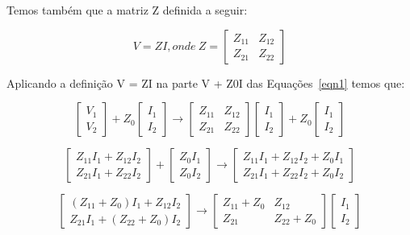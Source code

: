 \documentclass[a4paper,12pt]{proc}
\begin{document}
\noindent Temos também que a matriz Z definida a seguir:

\[V = ZI, onde~ Z = \begin{bmatrix} Z_{11} & Z_{12} \\ Z_{21} & Z_{22} \end{bmatrix}\]

\noindent Aplicando a definição V = ZI na parte V + Z0I das Equações~\ref{eqn1} temos que:

\[\begin{bmatrix} V_{1}\\ V_{2} \end{bmatrix}+ Z_{0}\begin{bmatrix} I_{1}\\ I_{2} \end{bmatrix}\rightarrow \begin{bmatrix} Z_{11} & Z_{12} \\ Z_{21} & Z_{22} \end{bmatrix}\begin{bmatrix} I_{1}\\ I_{2} \end{bmatrix} + Z_{0}\begin{bmatrix} I_{1}\\ I_{2} \end{bmatrix}\]

\[\begin{bmatrix} Z_{11}I_{1} + Z_{12}I_{2}\\ Z_{21}I_{1} + Z_{22}I_{2} \end{bmatrix} + \begin{bmatrix} Z_{0}I_{1}\\ Z_{0}I_{2} \end{bmatrix}\rightarrow \begin{bmatrix} Z_{11}I_{1} + Z_{12}I_{2} + Z_{0}I_{1}\\ Z_{21}I_{1} + Z_{22}I_{2} + Z_{0}I_{2} \end{bmatrix}\]

\[\begin{bmatrix} (Z_{11} + Z_{0})I_{1} + Z_{12}I_{2}\\ Z_{21}I_{1} + (Z_{22}+Z_{0})I_{2} \end{bmatrix}\rightarrow \begin{bmatrix} Z_{11} + Z_{0} & Z_{12} \\ Z_{21} & Z_{22}+Z_{0} \end{bmatrix}\begin{bmatrix} I_{1}\\ I_{2} \end{bmatrix}\]
\end{document}
